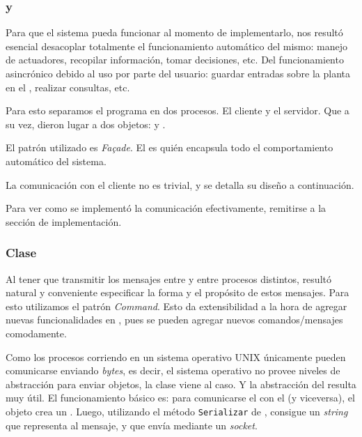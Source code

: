       \subsubsection{\cliente{} y \servidor{}}
          Para que el sistema pueda funcionar al momento de implementarlo, nos result\'o esencial
          desacoplar totalmente el funcionamiento autom\'atico del mismo: manejo de
          actuadores, recopilar informaci\'on, tomar decisiones, etc. Del funcionamiento
          asincr\'onico debido al uso por parte del usuario: guardar entradas sobre la
          planta en el \historial{}, realizar consultas, etc.

          Para esto separamos el programa en dos procesos. El cliente y el servidor.
          Que a su vez, dieron lugar a dos objetos: \cliente{} y \servidor{}.

          El patr\'on utilizado es \textit{Fa\c{c}ade}. El \servidor{} es qui\'en
          encapsula todo el comportamiento autom\'atico del sistema.

          La comunicaci\'on con el cliente no es trivial, y se detalla su dise\~no a
          continuaci\'on.

          Para ver como se implement\'o la comunicaci\'on efectivamente, remitirse
          a la secci\'on de implementaci\'on.
          
      \subsubsection{Clase \mensaje{}}
          Al tener que transmitir los mensajes entre \cliente{} y \servidor{} entre
          procesos distintos, result\'o natural y conveniente especificar la forma
          y el prop\'osito de estos mensajes.
          Para esto utilizamos el patr\'on \textit{Command}. Esto da extensibilidad
          a la hora de agregar nuevas funcionalidades en \servidor{}, pues se pueden
          agregar nuevos comandos/mensajes comodamente.

          Como los procesos corriendo en un sistema operativo \textsc{UNIX} \'unicamente
          pueden comunicarse enviando \textit{bytes}, es decir, el sistema operativo no
          provee niveles de abstracci\'on para enviar objetos, la clase
          \constructorMensaje{} viene al caso. Y la abstracci\'on del \mensaje{}
          resulta muy \'util.
          El funcionamiento b\'asico es: para comunicarse el \cliente{} con el \servidor{}
          (y viceversa), el objeto crea un \mensaje{}.
          Luego, utilizando el m\'etodo \texttt{Serializar} de \mensaje{}, consigue un
          \textit{string} que representa al mensaje, y que env\'ia mediante un \textit{socket}.


